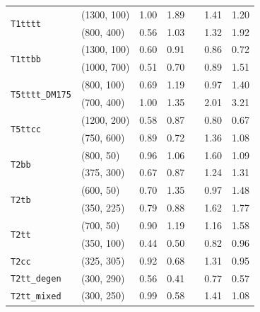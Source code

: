 \begin{table}[!t]
\begin{tabular}{ llccccc }
    \multirow{2}{*}{\texttt{T1tttt}}        & (1300, 100) & 1.00 & 1.89 &  & 1.41 & 1.20 \\
                                            & (800, 400)  & 0.56 & 1.03 &  & 1.32 & 1.92 \\ [0.5ex]
    \multirow{2}{*}{\texttt{T1ttbb}}        & (1300, 100) & 0.60 & 0.91 &  & 0.86 & 0.72 \\
                                            & (1000, 700) & 0.51 & 0.70 &  & 0.89 & 1.51 \\ [0.5ex]
    \multirow{2}{*}{\texttt{T5tttt\_DM175}} & (800, 100)  & 0.69 & 1.19 &  & 0.97 & 1.40 \\
                                            & (700, 400)  & 1.00 & 1.35 &  & 2.01 & 3.21 \\ [0.5ex]
    \multirow{2}{*}{\texttt{T5ttcc}}        & (1200, 200) & 0.58 & 0.87 &  & 0.80 & 0.67 \\
                                            & (750, 600)  & 0.89 & 0.72 &  & 1.36 & 1.08 \\ [0.5ex]
    \multirow{2}{*}{\texttt{T2bb}}          & (800, 50)   & 0.96 & 1.06 &  & 1.60 & 1.09 \\
                                            & (375, 300)  & 0.67 & 0.87 &  & 1.24 & 1.31 \\ [0.5ex]
    \multirow{2}{*}{\texttt{T2tb}}          & (600, 50)   & 0.70 & 1.35 &  & 0.97 & 1.48 \\
                                            & (350, 225)  & 0.79 & 0.88 &  & 1.62 & 1.77 \\ [0.5ex]
    \multirow{2}{*}{\texttt{T2tt}}          & (700, 50)   & 0.90 & 1.19 &  & 1.16 & 1.58 \\
                                            & (350, 100)  & 0.44 & 0.50 &  & 0.82 & 0.96 \\ [0.5ex]
    \multirow{1}{*}{\texttt{T2cc}}          & (325, 305)  & 0.92 & 0.68 &  & 1.31 & 0.95 \\ [0.5ex]
    \multirow{1}{*}{\texttt{T2tt\_degen}}   & (300, 290)  & 0.56 & 0.41 &  & 0.77 & 0.57 \\ [0.5ex]
    \multirow{1}{*}{\texttt{T2tt\_mixed}}   & (300, 250)  & 0.99 & 0.58 &  & 1.41 & 1.08 \\ [0.5ex]
    \hline
  \end{tabular}
\end{table}

